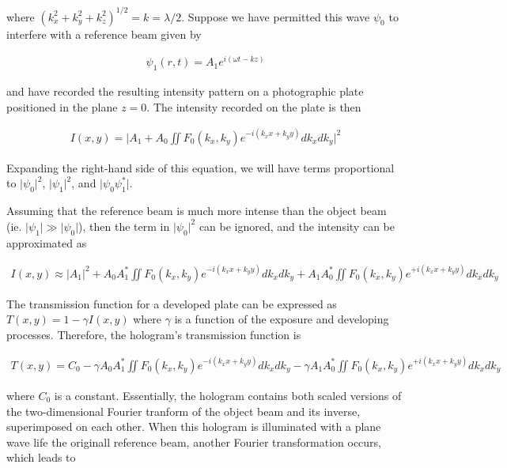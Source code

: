 \documentclass[12pt]{article}
\begin{document}
where $(k_x^2 + k_y^2 + k_z^2)^{1/2} = k = \lambda / 2$. Suppose we have permitted this wave $\psi_0$ to interfere with a reference beam given by

\vspace{-2ex}
\begin{gather*}
    \psi_1 (r,t) = A_1 e^{i(\omega t - kz)}
\end{gather*}

and have recorded the resulting intensity pattern on a photographic plate positioned in the plane $z = 0$. The intensity recorded on the plate is then

\vspace{-2ex}
\begin{gather*}
    I(x,y) = \lvert A_1 + A_0 \iint F_0 (k_x,k_y) e^{-i(k_x x + k_y y)} dk_x dk_y \rvert^2
\end{gather*}

Expanding the right-hand side of this equation, we will have terms proportional to $\lvert \psi_0 \rvert^2$, $\lvert \psi_1 \rvert^2$, and $\lvert \psi_0 \psi_1^* \rvert$.

Assuming that the reference beam is much more intense than the object beam (ie. $\lvert \psi_1 \rvert \gg \lvert \psi_0 \rvert$), then the term in $\lvert \psi_0 \rvert^2$ can be ignored,
and the intensity can be approximated as

\vspace{-2ex}
\begin{gather*}
    I (x,y) \approx \lvert A_1 \rvert^2 + A_0 A_1^* \iint F_0 (k_x,k_y) e^{-i(k_xx + k_yy)} dk_x dk_y + A_1 A_0^* \iint F_0 (k_x,k_y) e^{+i(k_xx + k_yy)} dk_x dk_y
\end{gather*}

The transmission function for a developed plate can be expressed as $T(x,y) = 1 - \gamma I(x,y)$ where $\gamma$ is a function of the exposure and
developing processes. Therefore, the hologram's transmission function is

\vspace{-2ex}
\begin{gather*}
    T(x,y) = C_0 - \gamma A_0A_1^* \iint F_0 (k_x,k_y) e^{-i(k_xx+k_yy)} dk_x dk_y - \gamma A_1 A_0^* \iint F_0 (k_x,k_y) e^{+i(k_xx +k_yy)} dk_x dk_y
\end{gather*}

where $C_0$ is a constant. Essentially, the hologram contains both scaled versions of the two-dimensional Fourier tranform of the object beam and its inverse, superimposed on each other.
When this hologram is illuminated with a plane wave life the originall reference beam, another Fourier transformation occurs, which leads to
\end{document}
